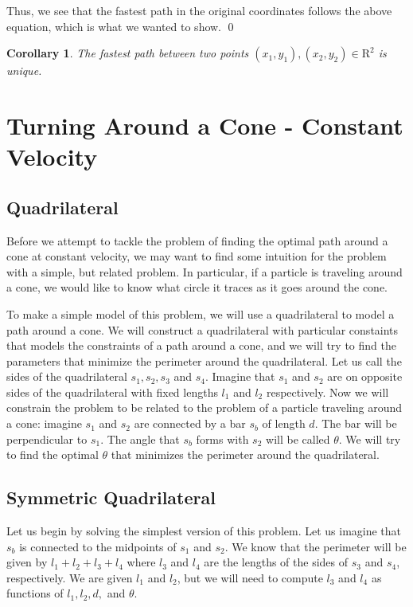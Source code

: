 \documentclass[12pt]{amsart}   %
\newtheorem{corollary}[theorem]{Corollary}
\begin{document}
Thus, we see that the fastest path in the original coordinates follows the above equation, which is what we wanted to show.
\qed

\begin{corollary}
  The fastest path between two points $(x_1, y_1), (x_2, y_2) \in \mathrm{R}^2$ is unique.
\end{corollary}


\section{Turning Around a Cone - Constant Velocity}

\subsection{Quadrilateral}

Before we attempt to tackle the problem of finding the optimal path around a cone at constant velocity, we may want to find some intuition for the problem with a simple, but related problem. In particular, if a particle is traveling around a cone, we would like to know what circle it traces as it goes around the cone.

To make a simple model of this problem, we will use a quadrilateral to model a path around a cone. We will construct a quadrilateral with particular constaints that models the constraints of a path around a cone, and we will try to find the parameters that minimize the perimeter around the quadrilateral. Let us call the sides of the quadrilateral $s_1, s_2, s_3$ and $s_4$. Imagine that $s_1$ and $s_2$ are on opposite sides of the quadrilateral with fixed lengths $l_1$ and $l_2$ respectively. Now we will constrain the problem to be related to the problem of a particle traveling around a cone: imagine $s_1$ and $s_2$ are connected by a bar $s_b$ of length $d$. The bar will be perpendicular to $s_1$. The angle that $s_b$ forms with $s_2$ will be called $\theta$. We will try to find the optimal $\theta$ that minimizes the perimeter around the quadrilateral.
\begin{figure}
\end{figure}

\subsection{Symmetric Quadrilateral}

Let us begin by solving the simplest version of this problem. Let us imagine that $s_b$ is connected to the midpoints of $s_1$ and $s_2$. We know that the perimeter will be given by $l_1 + l_2 + l_3 + l_4$ where $l_3$ and $l_4$ are the lengths of the sides of $s_3$ and $s_4$, respectively. We are given $l_1$ and $l_2$, but we will need to compute $l_3$ and $l_4$ as functions of $l_1, l_2,d, $ and $\theta$. 
\end{document}
